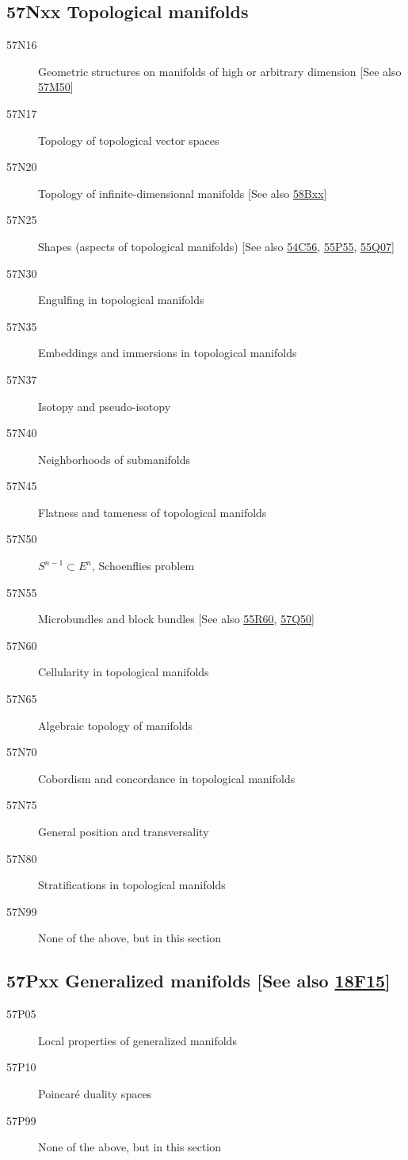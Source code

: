 \subsection*{57Nxx  Topological manifolds }\label{57Nxx}
\begin{description} 
\item [57N16]\label{57N16} Geometric structures on manifolds of high or arbitrary dimension [See also \hyperref[57M50]{57M50}]
\item [57N17]\label{57N17} Topology of topological vector spaces
\item [57N20]\label{57N20} Topology of infinite-dimensional manifolds [See also \hyperref[58Bxx]{58Bxx}]
\item [57N25]\label{57N25} Shapes (aspects of topological manifolds) [See also \hyperref[54C56]{54C56}, \hyperref[55P55]{55P55}, \hyperref[55Q07]{55Q07}]
\item [57N30]\label{57N30} Engulfing in topological manifolds
\item [57N35]\label{57N35} Embeddings and immersions in topological manifolds
\item [57N37]\label{57N37} Isotopy and pseudo-isotopy
\item [57N40]\label{57N40} Neighborhoods of submanifolds
\item [57N45]\label{57N45} Flatness and tameness of topological manifolds
\item [57N50]\label{57N50} $S^{n-1}\subset E^n$, Schoenflies problem
\item [57N55]\label{57N55} Microbundles and block bundles [See also \hyperref[55R60]{55R60}, \hyperref[57Q50]{57Q50}]
\item [57N60]\label{57N60} Cellularity in topological manifolds
\item [57N65]\label{57N65} Algebraic topology of manifolds
\item [57N70]\label{57N70} Cobordism and concordance in topological manifolds
\item [57N75]\label{57N75} General position and transversality
\item [57N80]\label{57N80} Stratifications in topological manifolds
\item [57N99]\label{57N99} None of the above, but in this section
\end{description}
\subsection*{57Pxx  Generalized manifolds [See also \hyperref[18F15]{18F15}] }\label{57Pxx}
\begin{description}  
\item [57P05]\label{57P05} Local properties of generalized manifolds
\item [57P10]\label{57P10} Poincar\'{e} duality spaces
\item [57P99]\label{57P99} None of the above, but in this section
\end{description}
